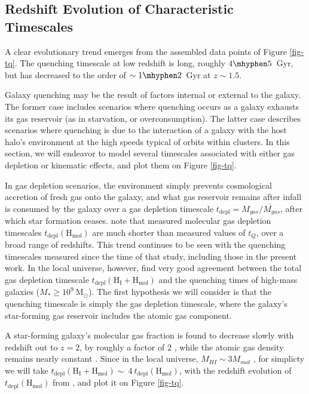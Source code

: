 \subsection{Redshift Evolution of Characteristic Timescales}

A clear evolutionary trend emerges from the assembled data points of Figure \ref{fig-tq}.
The quenching timescale at low redshift is long, roughly $4\mhyphen5$~Gyr, but has decreased to the order of $\sim1\mhyphen2$~Gyr at $z\sim1.5$.

Galaxy quenching may be the result of factors internal or external to the galaxy.
The former case includes scenarios where quenching occurs as a galaxy exhausts its gas reservoir (as in starvation, or overconsumption).
The latter case describes scenarios where quenching is due to the interaction of a galaxy with the host halo's environment at the high speeds typical of orbits within clusters.
In this section, we will endeavor to model several timescales associated with either gas depletion or kinematic effects, and plot them on Figure \ref{fig-tq}.

In gas depletion scenarios, the environment simply prevents cosmological accretion of fresh gas onto the galaxy, and what gas reservoir remains after infall is consumed by the galaxy over a gas depletion timescale $t_{\mathrm{depl}} = M_{gas}/\dot{M_{gas}}$, after which star formation ceases.
\citet{Fillingham:2015aa} note that measured molecular gas depletion timescales $t_{\mathrm{depl}}(\mathrm{H_{mol}})$ are much shorter than measured values of $t_Q$, over a broad range of redshifts.
This trend continues to be seen with the quenching timescales measured since the time of that study, including those in the present work.
In the local universe, however, \citet{Fillingham:2015aa} find very good agreement between the total gas depletion timescale $t_{\mathrm{depl}}(\mathrm{H_I}+\mathrm{H_{mol}})$ and the quenching times of high-mass galaxies ($M_* \geq 10^{9}~ \mathrm{M}_\odot$).
The first hypothesis we will consider is that the quenching timescale is simply the gas depletion timescale, where the galaxy's star-forming gas reservoir includes the atomic gas component.

A star-forming galaxy's molecular gas fraction is found to decrease slowly with redshift out to $z=2$, by roughly a factor of 2 \citep{Genzel:2015aa,Tacconi:2017aa}, while the atomic gas density remains nearly constant \citep{Bauermeister:2010aa}.
Since in the local universe, $M_{HI}\sim3M_{mol}$ \citep[see, e.g.,][]{Saintonge:2011aa}, for simplicty we will take $t_{\mathrm{depl}}(\mathrm{H_I}+\mathrm{H_{mol}})\sim~4~ t_{\mathrm{depl}}(\mathrm{H_{mol}})$, with the redshift evolution of $t_{\mathrm{depl}}(\mathrm{H_{mol}})$ from \citet{Tacconi:2017aa}, and plot it on Figure \ref{fig-tq}.

